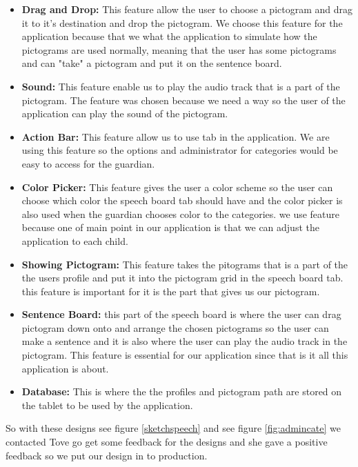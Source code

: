 \begin{itemize}
	\item \textbf{Drag and Drop:} This feature allow the user to choose a pictogram and drag it to it's destination and drop the pictogram.  We choose this feature for the application because that we what the application to simulate how the pictograms are used normally, meaning that the user has some pictograms and can "take" a pictogram and put it on the sentence board.  
	\item \textbf{Sound:} This feature enable us to play the audio track that is a part of the pictogram. The feature was chosen because we need a way so the user of the application can play the sound of the pictogram. 
	\item \textbf{Action Bar:} This feature allow us to use tab in the application. We are using this feature so the options and administrator for categories would be easy to access for the guardian. 
	\item \textbf{Color Picker:} This feature gives the user a color scheme so the user can choose which color the speech board tab should have and the color picker is also used when the guardian chooses color to the categories. we use feature because one of main point in our application is that we can adjust the application to each child. 
	\item \textbf{Showing Pictogram:} This feature takes the pitograms that is a part of the the users profile and put it into the pictogram grid in the speech board tab. this feature is important for it is the part that gives us our pictogram. 
	\item \textbf{Sentence Board:} this part of the speech board is where the user can drag pictogram down onto and arrange the chosen pictograms so the user can make a sentence and it is also where the user can play the audio track in the pictogram. This feature is essential for our application since that is it all this application is about. 
	\item \textbf{Database:} This is where the the profiles and pictogram path are stored on the tablet to be used by the application.
\end{itemize}

So with these designs see figure \ref{sketchspeech} and see figure \ref{fig:admincate} we contacted Tove go get some feedback for the designs and she gave a positive feedback so we put our design in to production.   